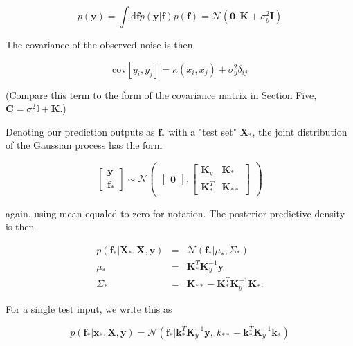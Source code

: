 \documentclass[12pt]{article}
\begin{document}
\begin{equation}
p(\textbf{y})=\int\mbox{d}\textbf{f}p(\textbf{y}|\textbf{f})p(\textbf{f})=\mathcal{N}(\textbf{0}, \textbf{K}+\sigma_y^2\textbf{I})
\end{equation}


The covariance of the observed noise is then

\begin{equation}
\mbox{cov}[y_i,y_j]=\kappa(x_i,x_j)+\sigma^2_y\delta_{ij}
\end{equation}

(Compare this term to the form of the covariance matrix in Section Five, \\ $\textbf{C}=\sigma^2\mathbb{I}+\textbf{K}$.)

Denoting our prediction outputs as $\textbf{f}_{*}$ with a "test set" $\textbf{X}_{*}$, the joint distribution of the Gaussian process has the form 

\[
\begin{bmatrix}
  \textbf{y} \\  \textbf{f}_{*}
\end{bmatrix}
\sim\mathcal{N}
\begin{pmatrix}\begin{bmatrix}
  \textbf{0} 
\end{bmatrix}, 
\begin{bmatrix}
\textbf{K}_{y} & \textbf{K}_{*} \\ \textbf{K}^{T}_{*} & \textbf{K}_{**} 
\end{bmatrix}\end{pmatrix}
\]

again, using mean equaled to zero for notation. The posterior predictive density is then


\begin{eqnarray*}
p(\textbf{f}_{*}|\textbf{X}_{*}, \textbf{X}, \textbf{y}) & = & \mathcal{N}(\textbf{f}_{*}|\mu_{*}, \Sigma_{*}) \\
\mu_{*} & = & \textbf{K}^{T}_{*}\textbf{K}^{-1}_{y}\textbf{y} \\
\Sigma_{*} & = & \textbf{K}_{**}-\textbf{K}_{*}^{T}\textbf{K}^{-1}_{y}\textbf{K}_{*}.
\end{eqnarray*}

For a single test input, we write this as 

\begin{equation}
p(\textbf{f}_{*}|\textbf{x}_{*}, \textbf{X}, \textbf{y}) = \mathcal{N}(\textbf{f}_{*}|\textbf{k}^{T}_{*}\textbf{K}^{-1}_{y}\textbf{y}, \ k_{**}-\textbf{k}^{T}_{*}\textbf{K}^{-1}_y\textbf{k}_{*})
\end{equation}
\end{document}

